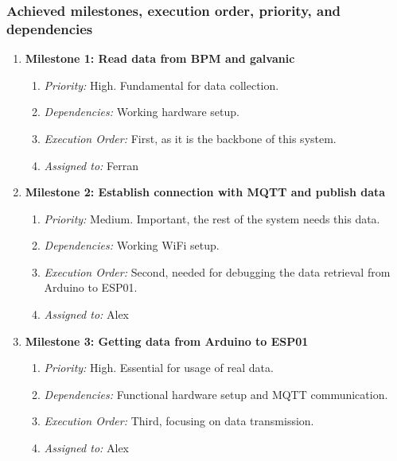 \subsubsection{Achieved milestones, execution order, priority, and dependencies}
\begin{enumerate}
    \item \textbf{Milestone 1: Read data from BPM and galvanic}
        \begin{enumerate}
            \item \textit{Priority:} High. Fundamental for data collection.
            \item \textit{Dependencies:} Working hardware setup.
            \item \textit{Execution Order:} First, as it is the backbone of this system.
            \item \textit{Assigned to:} Ferran
        \end{enumerate}

    \item \textbf{Milestone 2: Establish connection with MQTT and publish data}
        \begin{enumerate}
            \item \textit{Priority:} Medium. Important, the rest of the system needs this data.
            \item \textit{Dependencies:} Working WiFi setup.
            \item \textit{Execution Order:} Second, needed for debugging the data retrieval from Arduino to ESP01.
            \item \textit{Assigned to:} Alex
        \end{enumerate}

    \item \textbf{Milestone 3: Getting data from Arduino to ESP01}
        \begin{enumerate}
            \item \textit{Priority:} High. Essential for usage of real data.
            \item \textit{Dependencies:} Functional hardware setup and MQTT communication.
            \item \textit{Execution Order:} Third, focusing on data transmission.
            \item \textit{Assigned to:} Alex
        \end{enumerate}
\end{enumerate}

